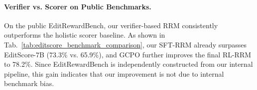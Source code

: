 \paragraph{Verifier vs. Scorer on Public Benchmarks.}
On the public EditRewardBench, our verifier-based RRM consistently outperforms the holistic scorer baseline. As shown in Tab.~\ref{tab:editscore_benchmark_comparison}, our SFT-RRM already surpasses EditScore-7B (73.3\% vs. 65.9\%), and GCPO further improves the final RL-RRM to 78.2\%. Since EditRewardBench is independently constructed from our internal pipeline, this gain indicates that our improvement is not due to internal benchmark bias. 
